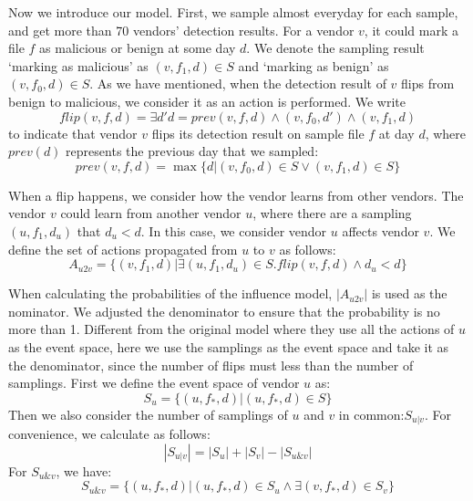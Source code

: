 Now we introduce our model. First, we sample almost everyday for each sample, and get more than 70 vendors' detection results. 
For a vendor $v$, it could mark a file $f$ as malicious or benign at some day $d$. 
We denote the sampling result `marking as malicious' as $(v, f_1, d) \in S$ and `marking as benign' as $(v, f_0, d) \in S$. 
As we have mentioned, when the detection result of $v$ flips from benign to malicious, we consider it as an action is performed. We write 
\[flip(v, f, d) = \exists d' d=prev(v, f, d) \land (v, f_0, d') \land (v, f_1, d) \] 
to indicate that vendor $v$ flips its detection result on sample file $f$ at day $d$, where $prev(d)$ represents the previous day that we sampled: 
\[prev(v, f, d) = \max \{d| (v, f_0, d)\in S \lor (v, f_1, d)\in S\}\]

When a flip happens, we consider how the vendor learns from other vendors. The vendor $v$ could learn from another vendor $u$, where there are a sampling $(u, f_1, d_u)$ that $d_u < d$. In this case, we consider vendor $u$ affects vendor $v$. 
We define the set of actions propagated from $u$ to $v$ as follows:
\begin{equation}
A_{u2v} = \{(v, f_1, d)| \exists (u, f_1, d_u)\in S. flip(v, f, d) \land d_u<d \}
\end{equation}

When calculating the probabilities of the influence model, $|A_{u2v}|$ is used as the nominator. 
We adjusted the denominator to ensure that the probability is no more than 1.
Different from the original model where they use all the actions of $u$ as the event space, here we use the samplings as the event space and take it as the denominator, since the number of flips must less than the number of samplings.
First we define the event space of vendor $u$ as:
\[
S_u = \{(u, f_*, d)|(u, f_*, d) \in S\}
\]
Then we also consider the number of samplings of $u$ and $v$ in common:$S_{u|v}$. For convenience, we calculate as follows: \[|S_{u|v}|=|S_u|+|S_v|-|S_{u\&v}|\] For $S_{u\&v}$, we have:
\[
S_{u\&v} = \{(u, f_*, d)| (u, f_*, d)\in S_u \land \exists (v, f_*, d)\in S_v \}
\]



